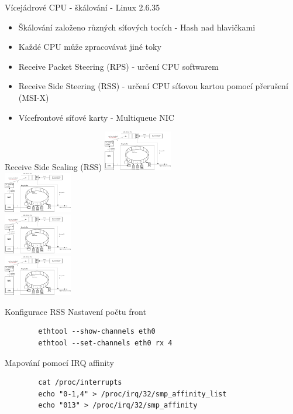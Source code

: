 \documentclass{beamer}
\begin{document}
\begin{frame}{Vícejádrové CPU - škálování - Linux 2.6.35}
	\begin{itemize}
		\item Škálování založeno různých síťových tocích - Hash nad hlavičkami
		\item Každé CPU může zpracovávat jiné toky
		\item Receive Packet Steering (RPS) - určení CPU softwarem
		\item Receive Side Steering (RSS) - určení CPU síťovou kartou pomocí přerušení (MSI-X)
		\item Vícefrontové síťové karty - Multiqueue NIC
	\end{itemize}
\end{frame}

\begin{frame}{Receive Side Scaling (RSS)}
	\centering
	\includegraphics[width=3cm,keepaspectratio]{fig/napi-workflow.png} \\
	\includegraphics[width=3cm,keepaspectratio]{fig/napi-workflow.png} \\
	\includegraphics[width=3cm,keepaspectratio]{fig/napi-workflow.png} \\
	\includegraphics[width=3cm,keepaspectratio]{fig/napi-workflow.png}
\end{frame}

\begin{frame}[fragile]{Konfigurace RSS}
	Nastavení počtu front
	\begin{lstlisting}
		ethtool --show-channels eth0
		ethtool --set-channels eth0 rx 4
	\end{lstlisting}
	Mapování pomocí IRQ affinity
	\begin{lstlisting}
		cat /proc/interrupts
		echo "0-1,4" > /proc/irq/32/smp_affinity_list
		echo "013" > /proc/irq/32/smp_affinity
	\end{lstlisting}
\end{frame}
\end{document}
